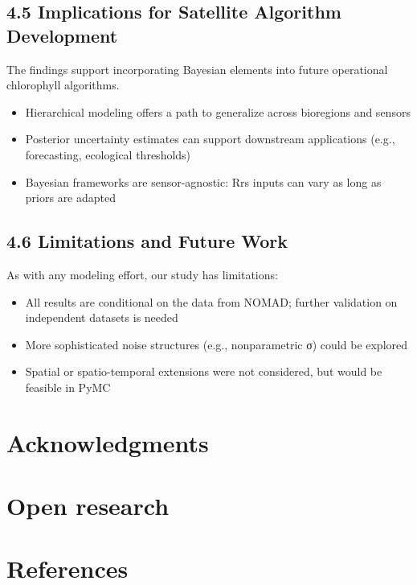\documentclass[
]{agujournal2019}
\providecommand{\tightlist}{%
  \setlength{\itemsep}{0pt}\setlength{\parskip}{0pt}}\usepackage{longtable,booktabs,array}
\begin{document}
\subsection{4.5 Implications for Satellite Algorithm
Development}\label{implications-for-satellite-algorithm-development}

The findings support incorporating Bayesian elements into future
operational chlorophyll algorithms.

\begin{itemize}
\tightlist
\item
  Hierarchical modeling offers a path to generalize across bioregions
  and sensors
\item
  Posterior uncertainty estimates can support downstream applications
  (e.g., forecasting, ecological thresholds)
\item
  Bayesian frameworks are sensor-agnostic: Rrs inputs can vary as long
  as priors are adapted
\end{itemize}

\subsection{4.6 Limitations and Future
Work}\label{limitations-and-future-work}

As with any modeling effort, our study has limitations:

\begin{itemize}
\tightlist
\item
  All results are conditional on the data from NOMAD; further validation
  on independent datasets is needed
\item
  More sophisticated noise structures (e.g., nonparametric σ) could be
  explored
\item
  Spatial or spatio-temporal extensions were not considered, but would
  be feasible in PyMC
\end{itemize}

\section{Acknowledgments}\label{acknowledgments}

\section{Open research}\label{open-research}

\section*{References}\label{references}
\end{document}
